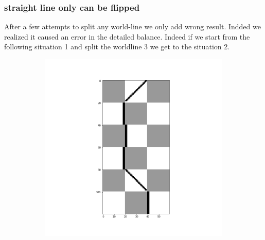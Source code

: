 \documentclass[a4paper,12pt,twoside]{article}
\begin{document}
		 	
		 
		 
	 \subsubsection{straight line only can be flipped}
	 After a few attempts to split any world-line we only add wrong result. Indded we realized it caused an error in the detailed balance.
	 Indeed if we start from the following situation 1 and split the worldline 3 we get to the situation 2.
	 
	 \begin{figure}[!h]
			 	\centering
			 	\begin{subfigure}[b]{0.3\textwidth}
			 		\includegraphics[scale=0.2]{situation1.png}
			 	\end{subfigure}
			 	\begin{subfigure}[b]{0.3\textwidth}

\end{subfigure}
\end{figure}
\end{document}
